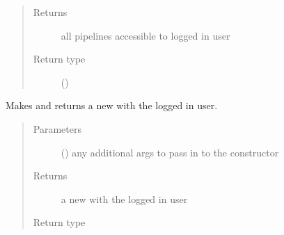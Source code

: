 \documentclass[letterpaper,10pt,english]{sphinxmanual}
\begin{document}
\begin{fulllineitems}
\begin{fulllineitems}
\begin{quote}
\begin{description}
\begin{itemize}
\end{itemize}

\item[{Returns}] \leavevmode
all pipelines accessible to logged in user

\item[{Return type}] \leavevmode
{}()

\end{description}\end{quote}

\end{fulllineitems}


\begin{fulllineitems}
\label{\detokenize{autoapi/pine/client/index:pine.client.PineClient.collection_builder}}
Makes and returns a new {\hyperref[\detokenize{autoapi/pine/client/models/index:pine.client.models.CollectionBuilder}]{}} with the logged in user.
\begin{quote}\begin{description}
\item[{Parameters}] \leavevmode
{} () \textendash{} any additional args to pass in to the constructor

\item[{Returns}] \leavevmode
a new {\hyperref[\detokenize{autoapi/pine/client/models/index:pine.client.models.CollectionBuilder}]{}} with the logged in user

\item[{Return type}] \leavevmode
{\hyperref[\detokenize{autoapi/pine/client/models/index:pine.client.models.CollectionBuilder}]{}}

\end{description}\end{quote}


\end{fulllineitems}
\end{fulllineitems}
\end{document}
